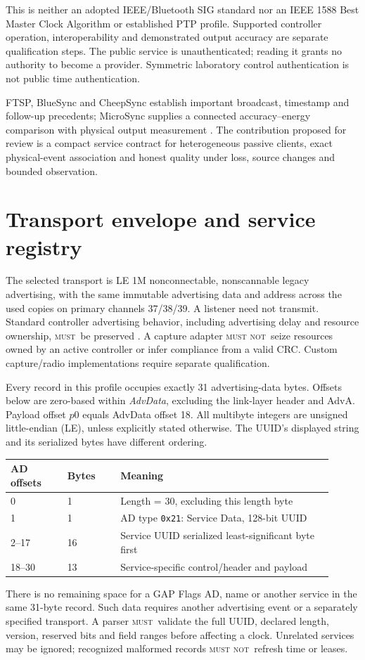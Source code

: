 \documentclass[11pt,letterpaper]{article}
\newcommand{\page}{\clearpage}
\newcommand{\must}{\textsc{must}}
\newcommand{\mustnot}{\textsc{must not}}
\newcommand{\hex}[1]{\texttt{#1}}
\begin{document}
This is neither an adopted IEEE/Bluetooth SIG standard nor an IEEE 1588 Best Master Clock Algorithm or established PTP profile. Supported controller operation, interoperability and demonstrated output accuracy are separate qualification steps. The public service is unauthenticated; reading it grants no authority to become a provider. Symmetric laboratory control authentication is not public time authentication.

FTSP, BlueSync and CheepSync establish important broadcast, timestamp and follow-up precedents; MicroSync supplies a connected accuracy--energy comparison with physical output measurement \cite{ftsp,blue,micro,cheep}. The contribution proposed for review is a compact service contract for heterogeneous passive clients, exact physical-event association and honest quality under loss, source changes and bounded observation.

\page
\section{Transport envelope and service registry}\label{sec:envelope}
The selected transport is LE 1M nonconnectable, nonscannable legacy advertising, with the same immutable advertising data and address across the used copies on primary channels 37/38/39. A listener need not transmit. Standard controller advertising behavior, including advertising delay and resource ownership, \must\ be preserved \cite{sig}. A capture adapter \mustnot\ seize resources owned by an active controller or infer compliance from a valid CRC. Custom capture/radio implementations require separate qualification.

Every record in this profile occupies exactly 31 advertising-data bytes. Offsets below are zero-based within \emph{AdvData}, excluding the link-layer header and AdvA. Payload offset $p0$ equals AdvData offset 18. All multibyte integers are unsigned little-endian (LE), unless explicitly stated otherwise. The UUID's displayed string and its serialized bytes have different ordering.

\begin{center}\small
\begin{tabular}{@{}L{0.16\linewidth}L{0.15\linewidth}L{0.60\linewidth}@{}}\toprule
AD offsets & Bytes & Meaning \\ & 1 & Length = 30, excluding this length byte \\
1 & 1 & AD type \hex{0x21}: Service Data, 128-bit UUID \\
2--17 & 16 & Service UUID serialized least-significant byte first \\
18--30 & 13 & Service-specific control/header and payload \\\bottomrule
\end{tabular}
\end{center}
There is no remaining space for a GAP Flags AD, name or another service in the same 31-byte record. Such data requires another advertising event or a separately specified transport. A parser \must\ validate the full UUID, declared length, version, reserved bits and field ranges before affecting a clock. Unrelated services may be ignored; recognized malformed records \mustnot\ refresh time or leases.
\end{document}
